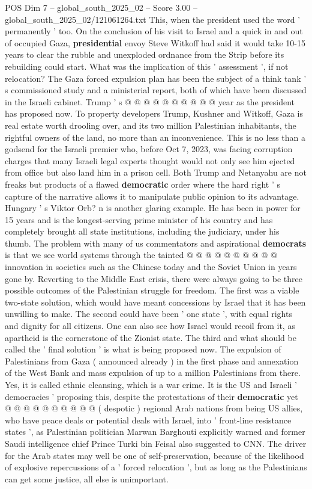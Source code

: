 \begin{textsample}{POS Dim 7 – global\_south\_2025\_02 – Score 3.00 – global\_south\_2025\_02/121061264.txt}
This, when the president used the word ' permanently ' too.
On the conclusion of his visit to Israel and a quick in and out of occupied Gaza, \textbf{presidential} envoy Steve Witkoff had said it would take 10-15 years to clear the rubble and unexploded ordnance from the Strip before its rebuilding could start.
What was the implication of this ' assessment ', if not relocation?
The Gaza forced expulsion plan has been the subject of a think tank ' s commissioned study and a ministerial report, both of which have been discussed in the Israeli cabinet.
Trump ' s @ @ @ @ @ @ @ @ @ @ year as the president has proposed now.
To property developers Trump, Kushner and Witkoff, Gaza is real estate worth drooling over, and its two million Palestinian inhabitants, the rightful owners of the land, no more than an inconvenience.
This is no less than a godsend for the Israeli premier who, before Oct 7, 2023, was facing corruption charges that many Israeli legal experts thought would not only see him ejected from office but also land him in a prison cell.
Both Trump and Netanyahu are not freaks but products of a flawed \textbf{democratic} order where the hard right ' s capture of the narrative allows it to manipulate public opinion to its advantage.
Hungary ' s Viktor Orb? n is another glaring example.
He has been in power for 15 years and is the longest-serving prime minister of his country and has completely brought all state institutions, including the judiciary, under his thumb.
The problem with many of us commentators and aspirational \textbf{democrats} is that we see world systems through the tainted @ @ @ @ @ @ @ @ @ @ innovation in societies such as the Chinese today and the Soviet Union in years gone by.
Reverting to the Middle East crisis, there were always going to be three possible outcomes of the Palestinian struggle for freedom.
The first was a viable two-state solution, which would have meant concessions by Israel that it has been unwilling to make.
The second could have been ' one state ', with equal rights and dignity for all citizens.
One can also see how Israel would recoil from it, as apartheid is the cornerstone of the Zionist state.
The third and what should be called the ' final solution ' is what is being proposed now.
The expulsion of Palestinians from Gaza ( announced already ) in the first phase and annexation of the West Bank and mass expulsion of up to a million Palestinians from there.
Yes, it is called ethnic cleansing, which is a war crime.
It is the US and Israeli ' democracies ' proposing this, despite the protestations of their \textbf{democratic} yet @ @ @ @ @ @ @ @ @ @ ( despotic ) regional Arab nations from being US allies, who have peace deals or potential deals with Israel, into ' front-line resistance states ', as Palestinian politician Marwan Barghouti explicitly warned and former Saudi intelligence chief Prince Turki bin Feisal also suggested to CNN.
The driver for the Arab states may well be one of self-preservation, because of the likelihood of explosive repercussions of a ' forced relocation ', but as long as the Palestinians can get some justice, all else is unimportant.

\end{textsample}
